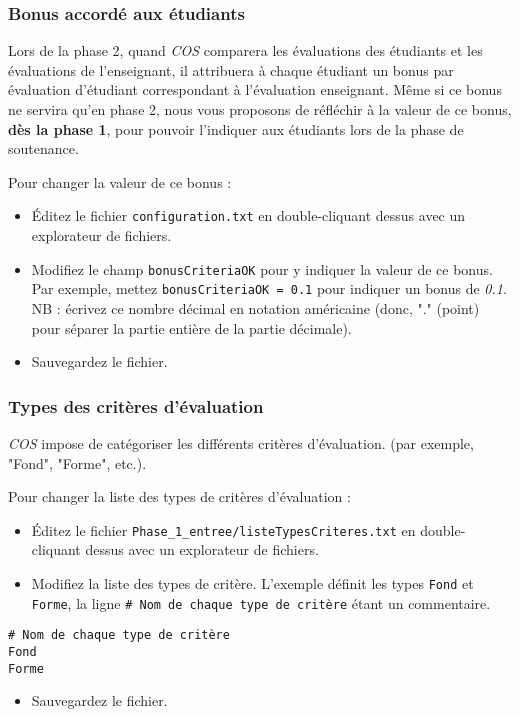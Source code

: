 \documentclass[11pt]{article}
\begin{document}
\subsubsection{Bonus accordé aux étudiants}
\label{sec-4-1-1}
Lors de la phase 2, quand \emph{COS} comparera les évaluations des
étudiants et les évaluations de l'enseignant, il attribuera à chaque
étudiant un bonus par évaluation d'étudiant correspondant à
l'évaluation enseignant. Même si ce bonus ne servira qu'en phase 2,
nous vous proposons de réfléchir à la valeur de ce bonus, \textbf{dès la
phase 1}, pour pouvoir l'indiquer aux étudiants lors de la phase de
soutenance.

Pour changer la valeur de ce bonus :
\begin{itemize}
\item Éditez le fichier \verb~configuration.txt~ en double-cliquant dessus
avec un explorateur de fichiers.
\item Modifiez le champ \verb~bonusCriteriaOK~ pour y indiquer la valeur de ce
bonus. Par exemple, mettez \verb~bonusCriteriaOK = 0.1~ pour indiquer un
bonus de \emph{0.1}. NB : écrivez ce nombre décimal en notation
américaine (donc, "." (point) pour séparer la partie entière de la
partie décimale).
\item Sauvegardez le fichier.
\end{itemize}
\subsubsection{Types des critères d'évaluation}
\label{sec-4-1-2}
\emph{COS} impose de catégoriser les différents critères d'évaluation. (par
exemple, "Fond", "Forme", etc.).

Pour changer la liste des types de critères d'évaluation :
\begin{itemize}
\item Éditez le fichier \verb~Phase_1_entree/listeTypesCriteres.txt~ en
double-cliquant dessus avec un explorateur de fichiers.
\item Modifiez la liste des types de critère. L'exemple définit les types
\verb~Fond~ et \verb~Forme~, la ligne \verb~# Nom de chaque type de critère~ étant
un commentaire.
\end{itemize}
\begin{verbatim}
# Nom de chaque type de critère
Fond
Forme
\end{verbatim}
\begin{itemize}
\item Sauvegardez le fichier.
\end{itemize}
\end{document}
